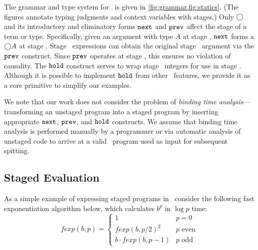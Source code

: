 The grammar and type system for \lang\ is given in
\ref{fig:grammar,fig:statics}. (The figures annotate typing judgments and context variables with stages.)
Only $\bigcirc$ and its introductory and eliminatory forms ${\tt next}$ and ${\tt prev}$ affect the stage
of a term or type.
Specifically, given an argument with type $A$ at stage \bbtwo, ${\tt next}$ forms a $\bigcirc A$ at stage \bbone.  
Stage \bbtwo\ expressions can obtain the original stage \bbtwo\ argument via the ${\tt prev}$ construct.  
Since ${\tt prev}$ operates at stage \bbtwo, this ensures no violation of causality.
The ${\tt hold}$ construct serves to wrap stage \bbone\ integers for use in stage \bbtwo.  
Although it is possible to implement ${\tt hold}$ from other \lang\ features, 
we provide it as a core primitive to simplify our examples. 

We note that our work does not consider the problem of {\em binding time analysis}---transforming an unstaged program into a staged program by inserting appropriate ${\tt next}$, ${\tt prev}$, and ${\tt hold}$ constructs. We assume that binding time analysis is performed manually by a programmer or via automatic analysis of unstaged code to arrive at a valid \lang\ program used as input for subsequent spitting.


\subsection{Staged Evaluation}

As a simple example of expressing staged programs in \lang\, consider the following fast exponentiation algorithm below, which 
calculates $b^p$ in $\log p$ time:
\[
	\mathit{fexp}(b,p) = \left \{ \begin{array}{ll} 
		1 &  p = 0 \\ 
		\mathit{fexp}(b,p/2)^2 & p \text{ even} \\ 
		b \cdot \mathit{fexp}(b,p-1) & p \text{ odd} \end{array}
	\right .
\]

